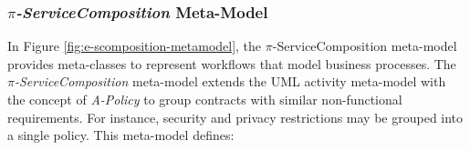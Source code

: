 \documentclass{singlecol-new}
\theoremstyle{TH}{
\newtheorem{lemma}{Lemma}
\newtheorem{theorem}[lemma]{Theorem}
\newtheorem{corrolary}[lemma]{Corrolary}
\newtheorem{conjecture}[lemma]{Conjecture}
\newtheorem{proposition}[lemma]{Proposition}
\newtheorem{claim}[lemma]{Claim}
\newtheorem{stheorem}[lemma]{Wrong Theorem}
\newtheorem{algorithm}{Algorithm}
}
\theoremstyle{THrm}{
\newtheorem{definition}{Definition}[section]
\newtheorem{question}{Question}[section]
\newtheorem{remark}{Remark}
\newtheorem{scheme}{Scheme}
}
\theoremstyle{THhit}{
\newtheorem{case}{Case}[section]
}
\theoremstyle{THhsl}{
\newtheorem{example}{Example}
}
\begin{document}
\subsubsection{\textit{$\pi$-ServiceComposition} Meta-Model}%

In Figure \ref{fig:e-scomposition-metamodel}, the $\pi$-Serv\-ice\-Com\-po\-si\-tion meta-model
provides meta-classes to represent workflows%
 that model  business processes.
The \textit{$\pi$-Serv\-ice\-Com\-po\-si\-tion} meta-model extends the UML activity  meta-model with the concept of  \textit{A-Policy}
to group contracts with similar non-functional requirements.
For instance, security and privacy restrictions may be grouped into a single policy.
 This meta-model defines:
\end{document}
